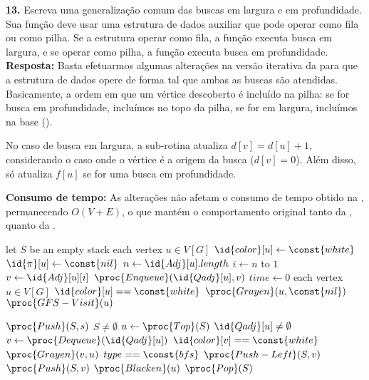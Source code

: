 
\textbf{13.} Escreva uma generalização comum das buscas em largura e em profundidade. Sua função deve usar uma estrutura de dados auxiliar que pode operar como fila ou como pilha. Se a estrutura operar como fila, a função executa busca em largura, e se operar como pilha, a função executa busca em profundidade.\\[6pt]
\textbf{Resposta:} Basta efetuarmos algumas alterações na versão iterativa da  para que a estrutura de dados opere de forma tal que ambas as buscas são atendidas. Basicamente, a ordem em que um vértice descoberto é incluído na pilha: se for busca em profundidade, incluímos no topo da pilha, se for em largura, incluímos na base ().

No caso de busca em largura, a sub-rotina  atualiza $d[v] = d[u] + 1$, considerando o caso onde o vértice é a origem da busca ($d[v] = 0$). Além disso,  só atualiza $f[u]$ se for uma busca em profundidade.

\textbf{Consumo de tempo:} As alterações não afetam o consumo de tempo obtido na , permanecendo $O(V + E)$, o que mantém o comportamento original tanto da , quanto da .

\begin{codebox}
\li \Comment let $S$ be an empty stack
\li \For each vertex $u \in V[G]$
\li \Do
        $\id{color}[u] \gets \const{white}$
\li     $\id{\pi}[u] \gets \const{nil}$
\li     $n \gets \id{Adj}[u].length$
\li     \For $i \gets n$ to $1$
\li     \Do
            $v \gets \id{Adj}[u][i]$
\li         $\proc{Enqueue}(\id{Qadj}[u], v)$
        \End
    \End
\li $time \gets 0$
\li \For each vertex $u \in V[G]$
\li \Do
        \If $\id{color}[u] == \const{white}$
\li     \Then 
            $\proc{Grayen}(u, \const{nil})$
\li         $\proc{GFS-Visit}(u)$
    \End
\end{codebox}

\begin{codebox}
\li $\proc{Push}(S, s)$
\li \While $S \neq \emptyset$
\li \Do
        $u \gets \proc{Top}(S)$
\li     \If $\id{Qadj}[u] \neq \emptyset$
\li     \Then
            $v \gets \proc{Dequeue}(\id{Qadj}[u])$
\li         \If $\id{color}[v] == \const{white}$
\li         \Then
                $\proc{Grayen}(v, u)$
\li             \If $type == \const{bfs}$
\li             \Then
                    $\proc{Push-Left}(S, v)$
\li             \Else
\li                 $\proc{Push}(S, v)$
                \End
            \End
\li     \Else
\li         $\proc{Blacken}(u)$
\li         $\proc{Pop}(S)$
        \End
    \End
\end{codebox}

